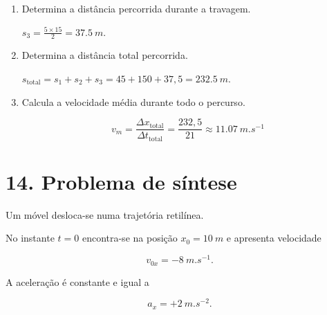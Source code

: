 \documentclass[11pt,a4paper]{article}
\begin{document}
\begin{enumerate}[label=\textbf{\arabic*.},resume]
		\item Determina a distância percorrida durante a travagem.
		
		\begin{solucao}
			$s_3 = \frac{5 \times 15}{2} = \SI{37.5}{m}$.
		\end{solucao}
		
		\item Determina a distância total percorrida.
		
		\begin{solucao}
			$s_{\text{total}} = s_1 + s_2 + s_3 = 45 + 150 + 37,5 = \SI{232.5}{m}$.
		\end{solucao}
		
		\item Calcula a velocidade média durante todo o percurso.
		
		\begin{solucao}
			\[
			v_m = \frac{\Delta x_{\text{total}}}{\Delta t_{\text{total}}} = \frac{232,5}{21} \approx \SI{11.07}{m.s^{-1}}
			\]
		\end{solucao}
		
	\end{enumerate}
	
	\section*{14. Problema de síntese}
	
	\begin{desafio}
		
		Um móvel desloca-se numa trajetória retilínea.
		
		No instante $t=0$ encontra-se na posição $x_0=\SI{10}{m}$ e apresenta
		velocidade
		
		\[
		v_{0x}=-\SI{8}{m.s^{-1}}.
		\]
		
		A aceleração é constante e igual a
		
		\[
		a_x=+\SI{2}{m.s^{-2}}.
		\]
		
	\end{desafio}
	
\end{document}
